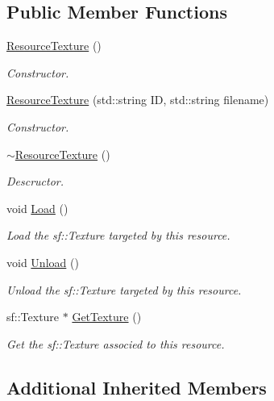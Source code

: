 \subsection*{Public Member Functions}
\begin{DoxyCompactItemize}
\item 
\mbox{\hyperlink{classsfmlbe_1_1_resource_texture_aa1a489c8fe125057b3009f6615093118}{Resource\+Texture}} ()
\begin{DoxyCompactList}\small\item\em Constructor. \end{DoxyCompactList}\item 
\mbox{\hyperlink{classsfmlbe_1_1_resource_texture_a458e1b22fd5074534d86f2665637ae34}{Resource\+Texture}} (std\+::string ID, std\+::string filename)
\begin{DoxyCompactList}\small\item\em Constructor. \end{DoxyCompactList}\item 
\mbox{\hyperlink{classsfmlbe_1_1_resource_texture_a98789b46742a42adffffe0abed982184}{$\sim$\+Resource\+Texture}} ()
\begin{DoxyCompactList}\small\item\em Descructor. \end{DoxyCompactList}\item 
void \mbox{\hyperlink{classsfmlbe_1_1_resource_texture_a4f8d27c8e50efce6d66a30edb078e2d3}{Load}} ()
\begin{DoxyCompactList}\small\item\em Load the sf\+::\+Texture targeted by this resource. \end{DoxyCompactList}\item 
void \mbox{\hyperlink{classsfmlbe_1_1_resource_texture_ac8b1b5866242e222abf0385144711646}{Unload}} ()
\begin{DoxyCompactList}\small\item\em Unload the sf\+::\+Texture targeted by this resource. \end{DoxyCompactList}\item 
sf\+::\+Texture $\ast$ \mbox{\hyperlink{classsfmlbe_1_1_resource_texture_a354d8f497b1ea0ca39c467219edc76c7}{Get\+Texture}} ()
\begin{DoxyCompactList}\small\item\em Get the sf\+::\+Texture associed to this resource. \end{DoxyCompactList}\end{DoxyCompactItemize}
\subsection*{Additional Inherited Members}


